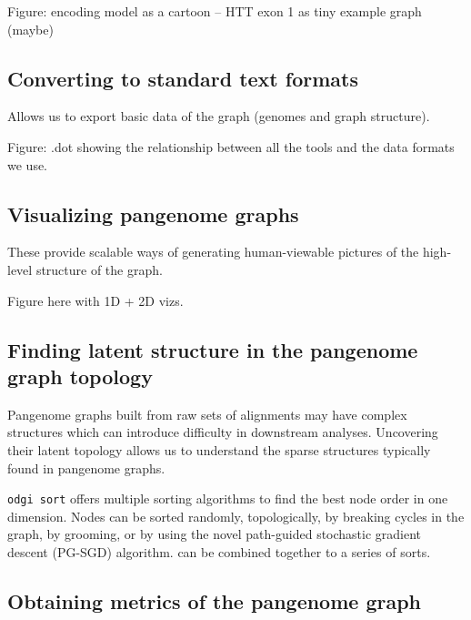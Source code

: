 \documentclass{bioinfo}
\begin{document}
Figure: encoding model as a cartoon --  HTT exon 1 as tiny example graph (maybe)

\subsection{Converting to standard text formats}


Allows us to export basic data of the graph (genomes and graph structure).

Figure: .dot showing the relationship between all the tools and the data formats we use.

\subsection{Visualizing pangenome graphs}


These provide scalable ways of generating human-viewable pictures of the high-level structure of the graph.

Figure here with 1D + 2D vizs.

\subsection{Finding latent structure in the pangenome graph topology}




Pangenome graphs built from raw sets of alignments may have complex structures which can introduce difficulty in downstream analyses. Uncovering their latent topology allows us to understand the sparse structures typically found in pangenome graphs.

\texttt{odgi sort} offers multiple sorting algorithms to find the best node order in one dimension. Nodes can be sorted randomly, topologically, by breaking cycles in the graph, by grooming, or by using the novel path-guided stochastic gradient descent (PG-SGD) algorithm.  can be combined together to a series of sorts.

\subsection{Obtaining metrics of the pangenome graph}
\end{document}
